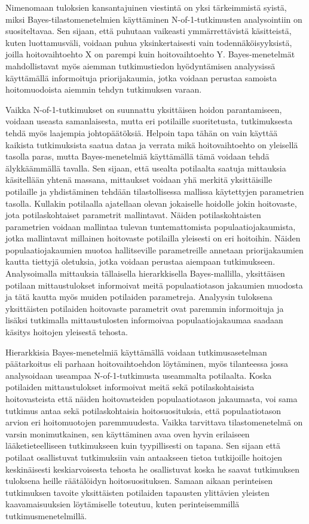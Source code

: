 \documentclass[12pt,a4paper,leqno]{report}
\theoremstyle{plain}
\theoremstyle{definition}
\theoremstyle{remark}
\begin{document}
Nimenomaan tuloksien kansantajuinen viestintä on yksi tärkeimmistä syistä, miksi
Bayes-tilastomenetelmien käyttäminen N-of-1-tutkimusten analysointiin on suositeltavaa.
Sen sijaan, että puhutaan vaikeasti ymmärrettävistä käsitteistä, kuten luottamusväli,
voidaan puhua yksinkertaisesti vain todennäköisyyksistä, joilla hoitovaihtoehto X on
parempi kuin hoitovaihtoehto Y. Bayes-menetelmät mahdollistavat myös aiemman
tutkimustiedon hyödyntämisen analyysissä käyttämällä informoituja priorijakaumia, jotka
voidaan perustaa samoista hoitomuodoista aiemmin tehdyn tutkimuksen varaan.

Vaikka N-of-1-tutkimukset on suunnattu yksittäisen hoidon parantamiseen, voidaan useasta
samanlaisesta, mutta eri potilaille suoritetusta, tutkimuksesta tehdä myös laajempia
johtopäätöksiä. Helpoin tapa tähän on vain käyttää kaikista tutkimuksista saatua dataa
ja verrata mikä hoitovaihtoehto on yleisellä tasolla paras, mutta Bayes-menetelmiä
käyttämällä tämä voidaan tehdä älykkäämmällä tavalla. Sen sijaan, että usealta
potilaalta saatuja mittauksia käsitellään yhtenä massana, mittaukset voidaan yhä merkitä
yksittäisille potilaille ja yhdistäminen tehdään tilastollisessa mallissa käytettyjen
parametrien tasolla. Kullakin potilaalla ajatellaan olevan jokaiselle hoidolle jokin
hoitovaste, jota potilaskohtaiset parametrit mallintavat. Näiden potilaskohtaisten
parametrien voidaan mallintaa tulevan tuntemattomista populaatiojakaumista, jotka
mallintavat millainen hoitovaste potilailla yleisesti on eri hoitoihin. Näiden
populaatiojakaumien muotoa hallitseville parametreille annetaan priorijakaumien kautta
tiettyjä oletuksia, jotka voidaan perustaa aiempaan tutkimukseen. Analysoimalla
mittauksia tällaisella hierarkkisella Bayes-mallilla, yksittäisen potilaan
mittaustulokset informoivat meitä populaatiotason jakaumien muodosta ja tätä kautta myös
muiden potilaiden parametreja. Analyysin tuloksena yksittäisten potilaiden hoitovaste
parametrit ovat paremmin informoituja ja lisäksi tutkimalla mittaustulosten informoivaa
populaatiojakaumaa saadaan käsitys hoitojen yleisestä tehosta.

Hierarkkisia Bayes-menetelmiä käyttämällä voidaan tutkimusasetelman päätarkoitus eli
parhaan hoitovaihtoehdon löytäminen, myös tilanteessa jossa analysoidaan useampaa
N-of-1-tutkimusta useammalta potilaalta. Koska potilaiden mittaustulokset informoivat
meitä sekä potilaskohtaisista hoitovasteista että näiden hoitovasteiden populaatiotason
jakaumasta, voi sama tutkimus antaa sekä potilaskohtaisia hoitosuosituksia, että
populaatiotason arvion eri hoitomuotojen paremmuudesta. Vaikka tarvittava
tilastomenetelmä on varsin monimutkainen, sen käyttäminen avaa oven hyvin erilaiseen
lääketieteelliseen tutkimukseen kuin tyypillisesti on tapana. Sen sijaan että potilaat
osallistuvat tutkimuksiin vain antaakseen tietoa tutkijoille hoitojen keskinäisesti
keskiarvoisesta tehosta he osallistuvat koska he saavat tutkimuksen tuloksena heille
räätälöidyn hoitosuosituksen. Samaan aikaan perinteisen tutkimuksen tavoite yksittäisten
potilaiden tapausten ylittävien yleisten kaavamaisuuksien löytämiselle toteutuu, kuten
perinteisemmillä tutkimusmenetelmillä.
\end{document}
